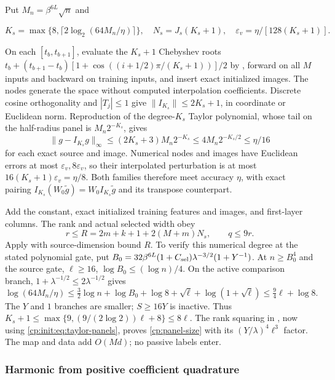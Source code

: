 Put $M_n=\beta^{6L}\sqrt n$ and

\begin{equation}
\label{cp:init:eq:taylor-nodes}
K_s=\max\{8,\lceil2\log_2(64M_n/\eta)\rceil\},\quad
N_s=J_s(K_s+1),\quad
\varepsilon_v=\eta/[128(K_s+1)].
\end{equation}

On each $[t_b,t_{b+1}]$, evaluate the $K_s+1$ Chebyshev roots
$t_b+(t_{b+1}-t_b)[1+\cos((i+1/2)\pi/(K_s+1))]/2$
by , forward on all $M$ inputs and backward
on training inputs, and insert exact initialized images.
The nodes generate the space without computed interpolation coefficients.
Discrete cosine orthogonality and $|T_j|\le1$ give
$\|I_{K_s}\|\le2K_s+1$, in coordinate or Euclidean norm.
Reproduction of the degree-$K_s$ Taylor polynomial, whose tail on the
half-radius panel is $M_n2^{-K_s}$, gives
\[
\|g-I_{K_s}g\|_\infty
 \le(2K_s+3)M_n2^{-K_s}\le4M_n2^{-K_s/2}\le\eta/16
\]
for each exact source and image. Numerical nodes and images have
Euclidean errors at most $\varepsilon_v,8\varepsilon_v$, so their
interpolated perturbation is at most $16(K_s+1)\varepsilon_v=\eta/8$.
Both families therefore meet accuracy $\eta$, with exact pairing
$I_{K_s}(W_0\widetilde g)=W_0I_{K_s}\widetilde g$ and its transpose
counterpart.

Add the constant, exact initialized training features and images, and
first-layer columns. The rank and actual selected width obey
\begin{equation}
\label{cp:init:eq:taylor-rank}
r\le R=2m+k+1+2(M+m)N_s,\qquad q\le9r.
\end{equation}
Apply  with source-dimension bound $R$.
To verify this numerical degree at the stated polynomial gate, put
$B_0=32\beta^{6L}(1+C_{\rm sel})\lambda^{-3/2}(1+Y^{-1})$.
At $n\ge B_0^4$ and the source gate,
$\ell\ge16$, $\log B_0\le(\log n)/4$. On the active comparison
branch, $1+\lambda^{-1/2}\le2\lambda^{-1/2}$ gives
\[
\log(64M_n/\eta)
\le\tfrac32\log n+\log B_0+\log8+\sqrt\ell+\log(1+\sqrt\ell)
\le\tfrac94\ell+\log8.
\]
The $Y$ and $1$ branches are smaller; $S\ge16Y$ is inactive.
Thus $K_s+1\le\max\{9,(9/(2\log2))\ell+8\}\le8\ell$.
The rank squaring in , now using
\eqref{cp:init:eq:taylor-panels}, proves \eqref{cp:panel-size}
with its $(Y/\lambda)^4\ell^3$ factor. The map and data add $O(Md)$;
no passive labels enter.
\subsubsection{Harmonic from positive coefficient quadrature}
\label{cp:init:sec:harmonic}

